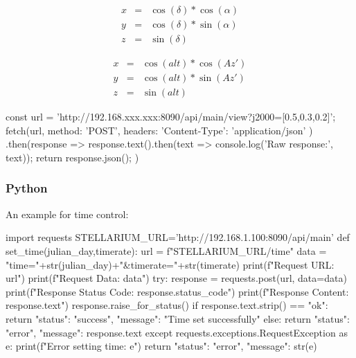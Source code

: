 \begin{minipage}{0.3\textwidth}
\begin{align*}
x & = & \cos(\delta)*\cos(\alpha)\\
y & = & \cos(\delta)*\sin(\alpha)\\
z & = & \sin(\delta)
\end{align*}
\end{minipage}\hspace{1cm}
\begin{minipage}{0.3\textwidth}
\begin{align*}
x & = & \cos(\mathit{alt})*\cos(\mathit{Az}')\\
y & = & \cos(\mathit{alt})*\sin(\mathit{Az}')\\
z & = & \sin(\mathit{alt}) 
\end{align*}
\end{minipage}
	
\begin{commandsScr}
const url = 'http://192.168.xxx.xxx:8090/api/main/view?j2000=[0.5,0.3,0.2]';
fetch(url, {
    method: 'POST',
    headers: {
      'Content-Type': 'application/json'
    }
  })
  .then(response => {
    response.text().then(text => console.log('Raw response:', text));
    return response.json();
  })
\end{commandsScr}

\subsubsection{Python}
\label{sec:plugins:RemoteControl:API:Python}

An example for time control:
\begin{commandsScr}
import requests
STELLARIUM_URL='http://192.168.1.100:8090/api/main'
def set_time(julian_day,timerate):
    url = f"{STELLARIUM_URL}/time"
    data = "time="+str(julian_day)+"&timerate="+str(timerate)
    print(f"Request URL: {url}")
    print(f"Request Data: {data}")
    try:
        response = requests.post(url, data=data)
        print(f"Response Status Code: {response.status_code}")
        print(f"Response Content: {response.text}")
        response.raise_for_status()
        if response.text.strip() == "ok":
            return {"status": "success", "message": "Time set successfully"}
        else:
            return {"status": "error", "message": response.text}
    except requests.exceptions.RequestException as e:
        print(f"Error setting time: {e}")
        return {"status": "error", "message": str(e)}
\end{commandsScr}

